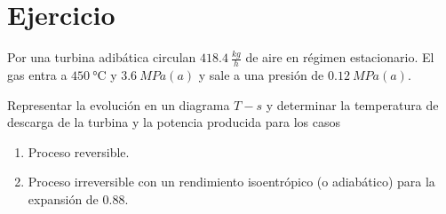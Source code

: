 \section{Ejercicio}\label{ej:Chap07Ejercicio27}
Por una turbina adibática circulan $\SI{418.4}{\frac{kg}{h}}$ de aire en régimen estacionario. El gas entra a $\SI{450}{\celsius}$ y $\SI{3.6}{MPa(a)}$ y sale a una presión de $\SI{0.12}{MPa(a)}$.

Representar la evolución en un diagrama $T-s$ y determinar la temperatura de descarga de la turbina y la potencia producida para los casos
\begin{enumerate}
    \item Proceso reversible.
    \item Proceso irreversible con un rendimiento isoentrópico (o adiabático) para la expansión de $0.88$.
\end{enumerate}